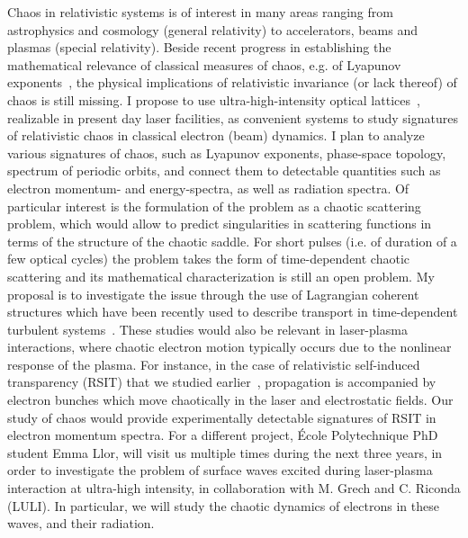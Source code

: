 \documentclass[11pt,a4paper,final]{moderncv}
\begin{document}
Chaos in relativistic systems is of interest in many areas ranging from astrophysics and cosmology (general relativity)
to accelerators, beams and plasmas (special relativity). 
Beside recent progress 
in establishing the mathematical 
relevance of classical measures of chaos, e.g. of Lyapunov exponents~\cite{motter03,motter09-1}, 
the physical implications of relativistic invariance (or lack thereof) of chaos is still missing.
I propose to use ultra-high-intensity optical lattices~\cite{sheng02}, realizable in present day laser facilities, 
as convenient systems to study
signatures of relativistic chaos in classical electron (beam) dynamics.
I plan to analyze various signatures of chaos, such as
Lyapunov exponents, phase-space topology, spectrum of periodic orbits, and connect them to detectable quantities such
as electron momentum- and energy-spectra, as well as radiation spectra. Of particular interest is the formulation of
the problem as a chaotic scattering problem, which would allow to predict singularities in scattering functions in terms of
the structure of the chaotic saddle. For short pulses (i.e. of duration of a few optical cycles)
the problem takes the form of time-dependent chaotic scattering and its mathematical characterization is still an open
problem. My proposal is to investigate the issue through the use of Lagrangian coherent structures which have been recently used
to describe transport in time-dependent turbulent systems~\cite{MHPRS07}. These studies would also be relevant in laser-plasma
interactions, where chaotic electron motion typically occurs due to the nonlinear response of the plasma. 
For instance, in the case of relativistic self-induced transparency (RSIT) that we studied earlier~\cite{siminos2012}, 
propagation is accompanied by electron bunches which move chaotically in the laser and electrostatic fields. 
Our study of chaos would provide experimentally detectable signatures of RSIT in electron momentum spectra. For a different
project, \'Ecole Polytechnique PhD student Emma Llor, will visit us multiple times during the next three years,
in order to investigate the problem of surface waves excited during laser-plasma interaction at ultra-high intensity,
in collaboration with M. Grech and C. Riconda (LULI).
In particular, we will study the chaotic dynamics of electrons in these waves, and their radiation. \\ \\ \\ 


\end{document}
